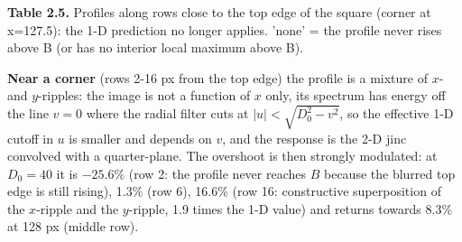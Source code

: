 \documentclass[10pt,a4paper]{article}
\begin{document}
\begin{table}[H]\centering\footnotesize{\small\textbf{Table 2.5.} Profiles along rows close to the top edge of the square (corner at x=127.5): the 1-D prediction no longer applies. 'none' = the profile never rises above B (or has no interior local maximum above B).\par}\vskip 3pt
\end{table}
\textbf{Near a corner} (rows 2-16 px from the top edge) the profile is a mixture of $x$- and $y$-ripples: the image is not a function of $x$ only, its spectrum has energy off the line $v=0$ where the radial filter cuts at $|u|<\sqrt{D_0^2-v^2}$, so the effective 1-D cutoff in $u$ is smaller and depends on $v$, and the response is the 2-D jinc convolved with a quarter-plane. The overshoot is then strongly modulated: at $D_0=40$ it is $-25.6\%$ (row 2: the profile never reaches $B$ because the blurred top edge is still rising), 1.3\% (row 6), 16.6\% (row 16: constructive superposition of the $x$-ripple and the $y$-ripple, 1.9 times the 1-D value) and returns towards 8.3\% at 128 px (middle row).
\end{document}
